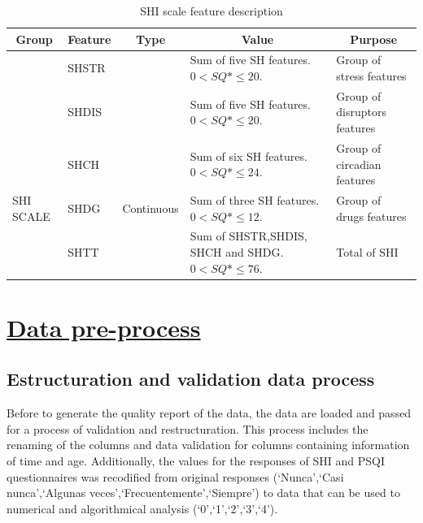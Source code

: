 \documentclass[]{book}
\begin{document}
\begin{table}[ht]
    \centering
    \caption{SHI scale feature description}
    \label{tab:SHI-scale-feature-description}
    \begin{tabular}{|l|l|l|p{4cm}|p{4cm}|}
        \hline
        \multicolumn{1}{|c|}{\textbf{Group}} & \multicolumn{1}{c|}{\textbf{Feature}} & \multicolumn{1}{c|}{\textbf{Type}} & \multicolumn{1}{c|}{\textbf{Value}}                    & \multicolumn{1}{c|}{\textbf{Purpose}} \\ \hline
                  & SHSTR                                 &         & Sum of five SH features. $ 0 < SQ*\leq 20 $.           & Group of stress features           \\ \cline{2-2} \cline{4-5} 
        & SHDIS                                 &                                    & Sum of five SH features. $ 0 < SQ*\leq 20 $.           & Group of disruptors features       \\ \cline{2-2} \cline{4-5} 
        \multirow{5}{*}{SHI SCALE} & SHCH          &       \multirow{5}{*}{Continuous}                             & Sum of six SH features. $ 0 < SQ*\leq 24 $.            & Group of circadian features        \\ \cline{2-2} \cline{4-5} 
        & SHDG                                  &                                    & Sum of three SH features. $ 0 < SQ*\leq 12 $.          & Group of drugs features            \\ \cline{2-2} \cline{4-5} 
        & SHTT                                  &                                    & Sum of SHSTR,SHDIS, SHCH and SHDG. $ 0 < SQ*\leq 76 $. & Total of SHI                       \\ \hline
    \end{tabular}
\end{table}

\chapter{\texorpdfstring{\protect\hyperlink{data-preprocess}{Data
pre-process}}{Data pre-process}}\label{data-pre-process}

\section{Estructuration and validation data
process}\label{estructuration-and-validation-data-process}

Before to generate the quality report of the data, the data are loaded
and passed for a process of validation and restructuration. This process
includes the renaming of the columns and data validation for columns
containing information of time and age. Additionally, the values for the
responses of SHI and PSQI questionnaires was recodified from original
responses (`Nunca',`Casi nunca',`Algunas
veces',`Frecuentemente',`Siempre') to data that can be used to numerical
and algorithmical analysis (`0',`1',`2',`3',`4').
\end{document}
